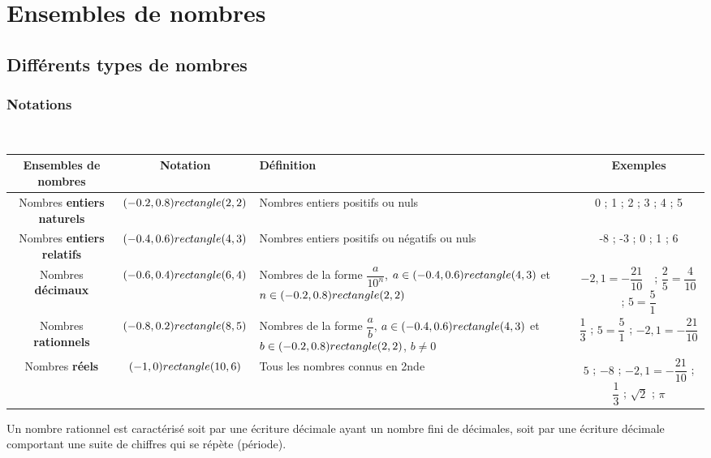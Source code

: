



\chapter{Ensembles de nombres}

\section{Différents types de nombres}

\subsection{Notations}

\begin{Définition} $ $ \\
\begin{center}
\renewcommand{\arraystretch}{2}
\begin{tabular}{|c|c|C{3.5cm}|c|}
\hline 
\textbf{Ensembles de nombres} & \textbf{Notation} & \textbf{Définition} & \textbf{Exemples} \\
\hline 
Nombres \textbf{entiers naturels} & $(-0.2,0.8) rectangle (2,2)$ &  Nombres entiers positifs ou nuls  &
 0 ; 1 ; 2 ; 3 ; 4 ; 5 \\ 
\hline 
Nombres \textbf{entiers relatifs} & $(-0.4,0.6) rectangle (4,3)$ &  Nombres entiers positifs ou négatifs ou nuls  & -8 ; -3 ; 0 ; 1 ; 6 \\ 
\hline 
Nombres \textbf{décimaux} & $(-0.6,0.4) rectangle (6,4)$ &  Nombres de la forme $\dfrac{a}{10^n}$, $a \in (-0.4,0.6) rectangle (4,3)$ et $n \in (-0.2,0.8) rectangle (2,2)$  &  $-2,1=-\dfrac{21}{10} \text{ }$ ; $\dfrac{2}{5}=\dfrac{4}{10}$ ; $5=\dfrac{5}{1}$ \\ 
\hline 
Nombres \textbf{rationnels} & $(-0.8,0.2) rectangle (8,5)$ & Nombres de la forme $\dfrac{a}{b}$, $a \in (-0.4,0.6) rectangle (4,3)$ et $b \in (-0.2,0.8) rectangle (2,2)$, $b \neq 0$ & $\dfrac{1}{3}$ ; $5=\dfrac{5}{1}$ ; $-2,1=-\dfrac{21}{10}$ \\ 
\hline 
Nombres \textbf{réels} & $(-1,0) rectangle (10,6)$ & Tous les nombres connus en 2nde  & $5$ ; $-8$ ; $-2,1=-\dfrac{21}{10}$ ; $\dfrac{1}{3}$ ; $\sqrt{2}$ ; $ \pi $ \\ 
\hline 
\end{tabular} 
\end{center}
\end{Définition}

\begin{Propriété}
Un nombre rationnel est caractérisé soit par une écriture décimale ayant un nombre fini de décimales, soit par une écriture décimale comportant une suite de chiffres qui se répète (période).
\end{Propriété}

